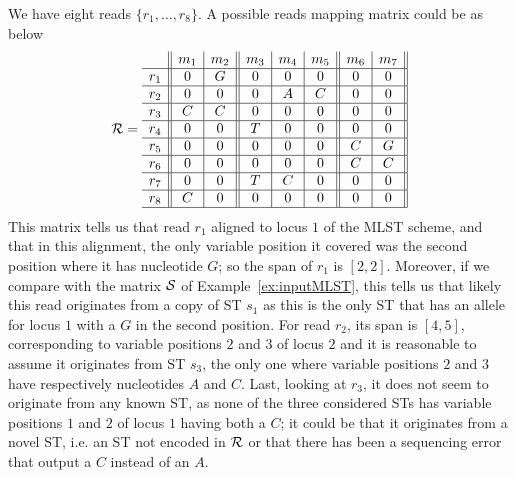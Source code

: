 \documentclass[10pt]{llncs}
\begin{document}
\begin{example}
    \label{ex:inputReads}
    We have eight reads $\{r_1,\dots,r_8\}$. A possible reads mapping matrix could be as below
    $${\cal R} = 
    \begin{array}{c||c|c||c|c|c||c|c||}
    & m_1 & m_2 & m_3 & m_4 & m_5 & m_6 & m_7 \\ \hline
    r_1 & 0 & G & 0 & 0 & 0 & 0 & 0 \\ \hline
    r_2 & 0 & 0 & 0 & A & C & 0 & 0 \\ \hline
    r_3 & C & C & 0 & 0 & 0 & 0 & 0 \\ \hline
    r_4 & 0 & 0 & T & 0 & 0 & 0 & 0 \\ \hline
    r_5 & 0 & 0 & 0 & 0 & 0 & C & G \\ \hline
    r_6 & 0 & 0 & 0 & 0 & 0 & C & C \\ \hline
    r_7 & 0 & 0 & T & C & 0 & 0 & 0 \\ \hline
    r_8 & C & 0 & 0 & 0 & 0 & 0 & 0 \\ \hline
    \end{array}
    $$
    This matrix tells us that read $r_1$ aligned to locus $1$ of the MLST scheme, and that in this alignment, the only variable position it covered was the second position where it has nucleotide $G$; so the span of $r_1$ is $[2,2]$. Moreover,  if we compare with the matrix $\cal S$ of Example~\ref{ex:inputMLST}, this tells us that likely this read originates from a copy of ST $s_1$ as this is the only ST that has an allele for locus $1$ with a $G$ in the second position. For read $r_2$, its span is $[4,5]$, corresponding to variable positions $2$ and $3$ of locus $2$ and it is reasonable to assume it originates from ST $s_3$, the only one where variable positions $2$ and $3$ have respectively nucleotides $A$ and $C$. Last, looking at $r_3$, it does not seem to originate from any known ST, as none of the three considered STs has variable positions $1$ and $2$ of locus $1$ having both a $C$; it could be that it originates from a novel ST, i.e. an ST not encoded in $\cal R$ or that there has been a sequencing error that output a $C$ instead of an $A$.
\end{example}

 
\end{document}
